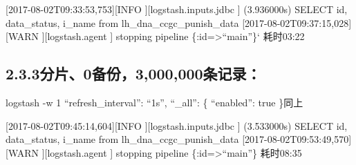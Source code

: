 \documentclass{article}
\begin{document}
[2017-08-02T09:33:53,753][INFO ][logstash.inputs.jdbc     ] (3.936000s) SELECT id, data\_status, i\_name from lh\_dna\_ccgc\_punish\_data              \mdbr
{}[2017-08-02T09:37:15,028][WARN ][logstash.agent           ] stopping pipeline \{:id=\textgreater{}\textquotedblleft{}main\textquotedblright{}\}‘              \mdbr
{}耗时03:22           %

\subsection{2.3.\hspace*{0.5em}3分片、0备份，3,000,000条记录：}\label{sec-303000000}%

\noindent{}logstash -w 1
\textquotedblleft{}refresh\_interval\textquotedblright{}: \textquotedblleft{}1s\textquotedblright{}, \textquotedblleft{}\_all\textquotedblright{}: \{ \textquotedblleft{}enabled\textquotedblright{}: true \}同上         %

[2017-08-02T09:45:14,604][INFO ][logstash.inputs.jdbc     ] (3.533000s) SELECT id, data\_status, i\_name from lh\_dna\_ccgc\_punish\_data             \mdbr
{}[2017-08-02T09:53:49,570][WARN ][logstash.agent           ] stopping pipeline \{:id=\textgreater{}\textquotedblleft{}main\textquotedblright{}\}             \mdbr
{}耗时08:35           %
\end{document}
